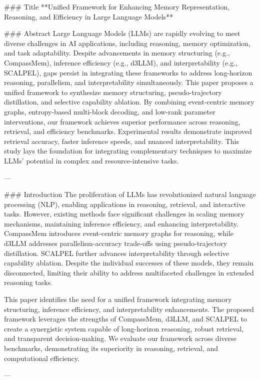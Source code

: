 ### Title
**Unified Framework for Enhancing Memory Representation, Reasoning, and Efficiency in Large Language Models**

### Abstract
Large Language Models (LLMs) are rapidly evolving to meet diverse challenges in AI applications, including reasoning, memory optimization, and task adaptability. Despite advancements in memory structuring (e.g., CompassMem), inference efficiency (e.g., d3LLM), and interpretability (e.g., SCALPEL), gaps persist in integrating these frameworks to address long-horizon reasoning, parallelism, and interpretability simultaneously. This paper proposes a unified framework to synthesize memory structuring, pseudo-trajectory distillation, and selective capability ablation. By combining event-centric memory graphs, entropy-based multi-block decoding, and low-rank parameter interventions, our framework achieves superior performance across reasoning, retrieval, and efficiency benchmarks. Experimental results demonstrate improved retrieval accuracy, faster inference speeds, and nuanced interpretability. This study lays the foundation for integrating complementary techniques to maximize LLMs' potential in complex and resource-intensive tasks.

---

### Introduction
The proliferation of LLMs has revolutionized natural language processing (NLP), enabling applications in reasoning, retrieval, and interactive tasks. However, existing methods face significant challenges in scaling memory mechanisms, maintaining inference efficiency, and enhancing interpretability. CompassMem introduces event-centric memory graphs for reasoning, while d3LLM addresses parallelism-accuracy trade-offs using pseudo-trajectory distillation. SCALPEL further advances interpretability through selective capability ablation. Despite the individual successes of these models, they remain disconnected, limiting their ability to address multifaceted challenges in extended reasoning tasks.

This paper identifies the need for a unified framework integrating memory structuring, inference efficiency, and interpretability enhancements. The proposed framework leverages the strengths of CompassMem, d3LLM, and SCALPEL to create a synergistic system capable of long-horizon reasoning, robust retrieval, and transparent decision-making. We evaluate our framework across diverse benchmarks, demonstrating its superiority in reasoning, retrieval, and computational efficiency.

---

